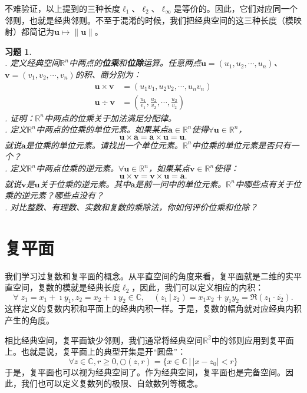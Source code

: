 \documentclass[12pt,UTF8]{ctexbook}
\newcommand{\nji}[2]{\displaystyle\left( #1 \,|\, #2\right)}
\theoremstyle{definition}
\theoremstyle{plain}
\newtheorem{xt}{习题}[section]
\begin{document}
不难验证，以上提到的三种长度$\ell_1$、$\ell_2$、$\ell_{\infty}$是等价的。因此，它们对应同一个邻则，也就是经典邻则。不至于混淆的时候，我们把经典空间的这三种长度（模映射）都简记为$\mathbf{u}\mapsto \|\mathbf{u}\|$。

\begin{xt}
    \mbox{} \\
    . 定义经典空间$\mathbb{R}^n$中两点的\textbf{位乘}和\textbf{位除}运算。任意两点$\mathbf{u} = (u_1, u_2, \cdots, u_n)$、$\mathbf{v} = (v_1, v_2, \cdots, v_n)$的积、商分别为：
    \begin{align*}
        \mathbf{u} \times \mathbf{v} &= (u_1 v_1, u_2 v_2, \cdots, u_n v_n) \\
        \mathbf{u} \div \mathbf{v} &= \left(\frac{u_1}{v_1}, \frac{u_2}{v_2}, \cdots, \frac{u_2}{v_2}\right)
    \end{align*}
    . 证明：$\mathbb{R}^n$中两点的位乘关于加法满足分配律。\\
    . 定义$\mathbb{R}^n$中两点的位乘的单位元素。如果某点$\mathbf{a}\in\mathbb{R}^n$使得$\forall \mathbf{u}\in\mathbb{R}^n$，
    $$\mathbf{u}\times \mathbf{a} = \mathbf{a}\times \mathbf{u} = \mathbf{u}.  $$
    就说$\mathbf{a}$是位乘的单位元素。请找出一个单位元素。$\mathbb{R}^n$中位乘的单位元素是否只有一个？\\
    . 定义$\mathbb{R}^n$中两点位乘的逆元素。$\forall \mathbf{u}\in\mathbb{R}^n$，如果某点$\mathbf{v}\in\mathbb{R}^n$使得：
    $$\mathbf{u}\times \mathbf{v} = \mathbf{v}\times \mathbf{u} = \mathbf{a}.  $$
    就说$\mathbf{v}$是$\mathbf{u}$关于位乘的逆元素。其中$\mathbf{a}$是前一问中的单位元素。$\mathbb{R}^n$中哪些点有关于位乘的逆元素？哪些点没有？\\
    . 对比整数、有理数、实数和复数的乘除法，你如何评价位乘和位除？
\end{xt}

\section{复平面}

我们学习过复数和复平面的概念。从平直空间的角度来看，复平面就是二维的实平直空间，复数的模就是经典长度$\ell_2$，因此，我们可以定义相应的内积：
$$ \forall \; z_1 = x_1 + \imath y_1, z_2 = x_2 + \imath y_2 \in \mathbb{C}, \quad \nji{z_1}{z_2} = x_1x_2 + y_1y_2 = \Re(z_1 \cdot \overline{z_2}). $$
这样定义的复数内积和平面上的经典内积一样。于是，复数的幅角就对应经典内积产生的角度。

相比经典空间，复平面缺少邻则，我们通常将经典空间$\mathbb{R}^2$中的邻则应用到复平面上。也就是说，复平面上的典型开集是开“圆盘”：
$$ \forall z \in \mathbb{C}, r\geqslant 0,  \bigcirc(z, r) = \{x \in \mathbb{C} \, | \, |x - z_0| < r \} $$
于是，复平面也可以视为经典空间了。作为经典空间，复平面也是完备空间。因此，我们也可以定义复数列的极限、自敛数列等概念。
\end{document}
